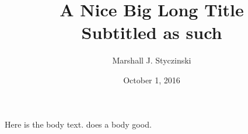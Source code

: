 \documentclass[12pt,letterpaper]{article}
\title{A Nice Big Long Title\\ \vspace{0.25cm} \large{Subtitled as such}}
\author{Marshall J. Styczinski}
\date{October 1, 2016}        %
\newcommand{\ch}{\textcolor{green}{\ding{51}}}        %
\begin{document}
\maketitle
\onehalfspacing












Here is the body text.  does a body good.


%
%
\end{document}
